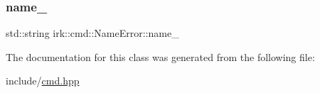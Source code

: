 \mbox{\label{classirk_1_1cmd_1_1NameError_a237c9a03da698698cec0107db449b962}} 
\subsubsection{\texorpdfstring{name\+\_\+}{name\_}}
{\footnotesize\ttfamily std\+::string irk\+::cmd\+::\+Name\+Error\+::name\+\_\+\hspace{0.3cm}{\ttfamily [protected]}}



The documentation for this class was generated from the following file\+:\begin{DoxyCompactItemize}
\item 
include/\mbox{\hyperlink{cmd_8hpp}{cmd.\+hpp}}\end{DoxyCompactItemize}
